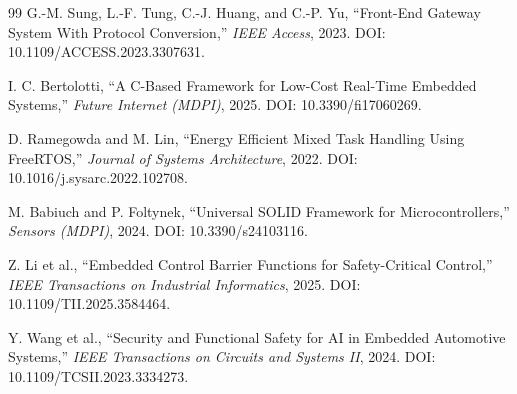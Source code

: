 \documentclass[12pt,a4paper]{article}
\begin{document}
\begin{thebibliography}{99}
 G.-M. Sung, L.-F. Tung, C.-J. Huang, and C.-P. Yu, ``Front-End Gateway System With Protocol Conversion,'' \textit{IEEE Access}, 2023. DOI: 10.1109/ACCESS.2023.3307631.

 I. C. Bertolotti, ``A C-Based Framework for Low-Cost Real-Time Embedded Systems,'' \textit{Future Internet (MDPI)}, 2025. DOI: 10.3390/fi17060269.

 D. Ramegowda and M. Lin, ``Energy Efficient Mixed Task Handling Using FreeRTOS,'' \textit{Journal of Systems Architecture}, 2022. DOI: 10.1016/j.sysarc.2022.102708.

 M. Babiuch and P. Foltynek, ``Universal SOLID Framework for Microcontrollers,'' \textit{Sensors (MDPI)}, 2024. DOI: 10.3390/s24103116.

 Z. Li et al., ``Embedded Control Barrier Functions for Safety-Critical Control,'' \textit{IEEE Transactions on Industrial Informatics}, 2025. DOI: 10.1109/TII.2025.3584464.

 Y. Wang et al., ``Security and Functional Safety for AI in Embedded Automotive Systems,'' \textit{IEEE Transactions on Circuits and Systems II}, 2024. DOI: 10.1109/TCSII.2023.3334273.

\end{thebibliography}
\end{document}
